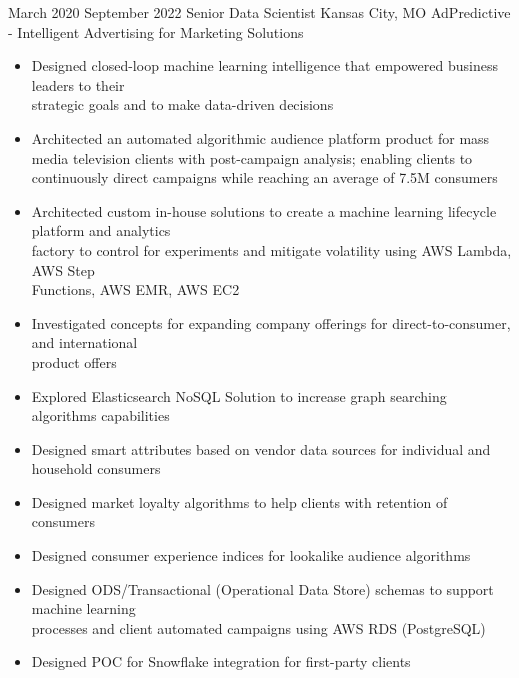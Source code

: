
\ProjectExperienceTwoSection
{March 2020}
{September 2022}
{Senior Data Scientist}
{Kansas City, MO}
{AdPredictive - Intelligent Advertising for Marketing Solutions}
{\begin{itemize}
    \item Designed closed-loop machine learning intelligence that empowered business leaders to
    their \\strategic goals and to make data-driven decisions
    \item Architected an automated algorithmic audience platform product for mass media
    television clients with post-campaign analysis; enabling clients to continuously direct
    campaigns while reaching an average of 7.5M consumers
    \item Architected custom in-house solutions to create a machine learning lifecycle platform
    and analytics \\factory to control for experiments and mitigate volatility using AWS Lambda, AWS
    Step \\Functions, AWS EMR, AWS EC2
\end{itemize}}
{\begin{itemize}
    \item Investigated concepts for expanding company offerings for direct-to-consumer, and
    international \\product offers
    \item Explored Elasticsearch NoSQL Solution to increase graph searching algorithms
    capabilities
    \item Designed smart attributes based on vendor data sources for individual and household
    consumers
    \item Designed market loyalty algorithms to help clients with retention of consumers
    \item Designed consumer experience indices for lookalike audience algorithms
    \item Designed ODS/Transactional (Operational Data Store) schemas to support machine learning
    \\processes and client automated campaigns using AWS RDS (PostgreSQL)
    \item Designed POC for Snowflake integration for first-party clients
\end{itemize}}